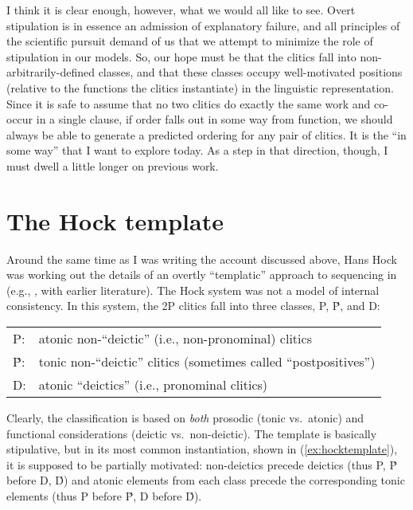 \documentclass[output=paper,
modfonts
]{LSP/langsci}
\begin{document}
I think it is clear enough, however, what we would all like to see. Overt stipulation
is in essence an admission of explanatory failure, and all principles of the scientific pursuit
demand of us that we attempt to minimize the role of stipulation in our models. So, our hope must be that the clitics 
fall into non-arbitrarily-defined classes, and that these  classes occupy 
well-motivated positions (relative to the functions the clitics instantiate) in the linguistic representation.
Since it is safe to assume that no two clitics do exactly the same work and co-occur in
a single clause, if order falls out in some way from function, we should always be able to generate
a predicted ordering for any pair of clitics. It is the ``in some way'' that I want
to explore today. As a step in that direction, though, I must dwell a little longer on previous work.%

\section{The Hock template}

Around the same time as I was writing the account discussed above, Hans Hock was
working out the details of an overtly ``templatic'' approach to  sequencing in   (e.g.,
\citealt{hock1996}, with earlier literature). 
The Hock system was not a model of internal consistency. In this system, the 2P clitics fall into three
classes, P, \'{P}, and {D}: 

\begin{exe}
\ex \begin{tabular}[t]{ll}
P: &  atonic non-``deictic'' (i.e., non-pronominal) clitics\\
\'{P}: & tonic non-``deictic'' clitics (sometimes called ``postpositives'')\\
D: & atonic ``deictics'' (i.e., pronominal clitics)\\
\end{tabular}
\end{exe}

\noindent Clearly, the classification is based on \textit{both} prosodic (tonic vs.\ atonic) and functional considerations
(deictic vs.\ non-deictic). The template is basically stipulative, but in its most common instantiation, shown in (\ref{ex:hocktemplate}), it is supposed to be 
partially motivated: non-deictics precede deictics (thus P, \'{P} before D, \'{D})
and atonic elements from
each class precede the corresponding tonic elements (thus P before \'{P}, D before \'{D}).
\end{document}
